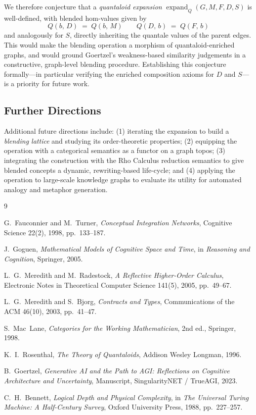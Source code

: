 \documentclass[11pt, a4paper]{article}
\theoremstyle{definition}
\theoremstyle{plain}
\theoremstyle{remark}
\newcommand{\expand}{\operatorname{expand}}
\begin{document}
We therefore conjecture that a \emph{quantaloid expansion}
$\expand_Q(G, M, F, D, S)$ is well-defined, with blended hom-values given by
\[
  Q(b,\, D) \;=\; Q(b,\, M)
  \qquad
  Q(D,\, b) \;=\; Q(F,\, b)
\]
and analogously for $S$, directly inheriting the quantale values of the parent
edges.  This would make the blending operation a morphism of quantaloid-enriched
graphs, and would ground Goertzel's weakness-based similarity judgements in a
constructive, graph-level blending procedure.  Establishing this conjecture
formally---in particular verifying the enriched composition axioms for $D$ and
$S$---is a priority for future work.

\subsection*{Further Directions}

Additional future directions include: (1) iterating the expansion to build a
\emph{blending lattice} and studying its order-theoretic properties; (2)
equipping the operation with a categorical semantics as a functor on a graph
topos; (3) integrating the construction with the Rho Calculus reduction
semantics to give blended concepts a dynamic, rewriting-based life-cycle; and
(4) applying the operation to large-scale knowledge graphs to evaluate its
utility for automated analogy and metaphor generation.

\begin{thebibliography}{9}

G.~Fauconnier and M.~Turner,
\textit{Conceptual Integration Networks},
Cognitive Science 22(2), 1998, pp.~133--187.

J.~Goguen,
\textit{Mathematical Models of Cognitive Space and Time},
in \textit{Reasoning and Cognition}, Springer, 2005.

L.~G.~Meredith and M.~Radestock,
\textit{A Reflective Higher-Order Calculus},
Electronic Notes in Theoretical Computer Science 141(5), 2005, pp.~49--67.

L.~G.~Meredith and S.~Bjorg,
\textit{Contracts and Types},
Communications of the ACM 46(10), 2003, pp.~41--47.

S.~Mac~Lane,
\textit{Categories for the Working Mathematician}, 2nd ed.,
Springer, 1998.

K.~I.~Rosenthal,
\textit{The Theory of Quantaloids},
Addison Wesley Longman, 1996.

B.~Goertzel,
\textit{Generative AI and the Path to AGI: Reflections on Cognitive
Architecture and Uncertainty},
Manuscript, SingularityNET / TrueAGI, 2023.

C.~H.~Bennett,
\textit{Logical Depth and Physical Complexity},
in \textit{The Universal Turing Machine: A Half-Century Survey},
Oxford University Press, 1988, pp.~227--257.

\end{thebibliography}
\end{document}
